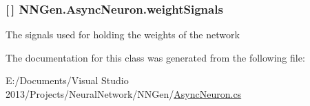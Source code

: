 \subsubsection[{weight\+Signals}]{ \mbox{[}$\,$\mbox{]} N\+N\+Gen.\+Async\+Neuron.\+weight\+Signals\hspace{0.3cm}{\ttfamily [get]}}\label{class_n_n_gen_1_1_async_neuron_aeeb431fe55c9cda6e2889691c27c344c}


The signals used for holding the weights of the network 



The documentation for this class was generated from the following file\+:\begin{DoxyCompactItemize}
\item 
E\+:/\+Documents/\+Visual Studio 2013/\+Projects/\+Neural\+Network/\+N\+N\+Gen/\hyperlink{_async_neuron_8cs}{Async\+Neuron.\+cs}\end{DoxyCompactItemize}
